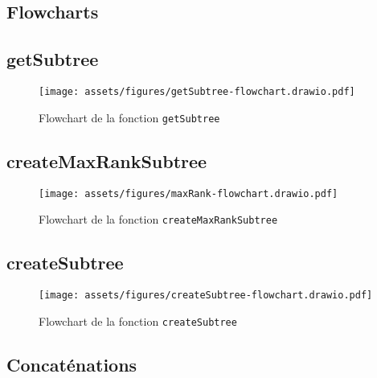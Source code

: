 \subsection{Flowcharts}

\subsection*{getSubtree}

\begin{figure}[H]
    \centering
    \texttt{[image: assets/figures/getSubtree-flowchart.drawio.pdf]}
    \caption{Flowchart de la fonction \texttt{getSubtree}}
    \label{fig:getsubtree-flowchart}
\end{figure}

\subsection*{createMaxRankSubtree}

\begin{figure}[H]
    \centering
    \texttt{[image: assets/figures/maxRank-flowchart.drawio.pdf]}
    \caption{Flowchart de la fonction \texttt{createMaxRankSubtree}}
    \label{fig:maxrank-flowchart}
\end{figure}

\subsection*{createSubtree}

\begin{figure}[H]
    \centering
    \texttt{[image: assets/figures/createSubtree-flowchart.drawio.pdf]}
    \caption{Flowchart de la fonction \texttt{createSubtree}}
    \label{fig:createsubtree-flowchart}
\end{figure}

\subsection{Concaténations}